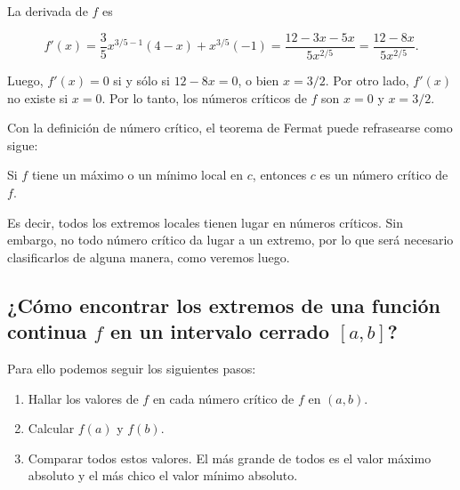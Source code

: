 \documentclass[
  letterpaper,
]{book}
\providecommand{\tightlist}{%
  \setlength{\itemsep}{0pt}\setlength{\parskip}{0pt}}
\theoremstyle{plain}
\theoremstyle{remark}
\begin{document}
\begin{tcolorbox}[enhanced jigsaw, opacityback=0, left=2mm, opacitybacktitle=0.6, toprule=.15mm, bottomrule=.15mm, colbacktitle=quarto-callout-tip-color!10!white, titlerule=0mm, bottomtitle=1mm, title=\textcolor{quarto-callout-tip-color}{\faLightbulb}\hspace{0.5em}{Solución}, toptitle=1mm, colframe=quarto-callout-tip-color-frame, colback=white, breakable, rightrule=.15mm, arc=.35mm, leftrule=.75mm, coltitle=black]

La derivada de \(f\) es

\[
f'(x)=\frac{3}{5}x^{3/5-1}(4-x)+x^{3/5}(-1)=\frac{12-3x-5x}{5x^{2/5}}=\frac{12-8x}{5x^{2/5}}.
\]

Luego, \(f'(x)=0\) si y sólo si \(12-8x=0\), o bien \(x=3/2\). Por otro
lado, \(f'(x)\) no existe si \(x=0\). Por lo tanto, los números críticos
de \(f\) son \(x=0\) y \(x=3/2\).

\end{tcolorbox}

Con la definición de número crítico, el teorema de Fermat puede
refrasearse como sigue:

Si \(f\) tiene un máximo o un mínimo local en \(c\), entonces \(c\) es
un número crítico de \(f\).

Es decir, todos los extremos locales tienen lugar en números críticos.
Sin embargo, no todo número crítico da lugar a un extremo, por lo que
será necesario clasificarlos de alguna manera, como veremos luego.

\subsection{\texorpdfstring{¿Cómo encontrar los extremos de una función
continua \(f\) en un intervalo cerrado
\([a,b]\)?}{¿Cómo encontrar los extremos de una función continua f en un intervalo cerrado {[}a,b{]}?}}\label{cuxf3mo-encontrar-los-extremos-de-una-funciuxf3n-continua-f-en-un-intervalo-cerrado-ab}

Para ello podemos seguir los siguientes pasos:

\begin{enumerate}
\def\labelenumi{\arabic{enumi}.}
\tightlist
\item
  Hallar los valores de \(f\) en cada número crítico de \(f\) en
  \((a,b)\).
\item
  Calcular \(f(a)\) y \(f(b)\).
\item
  Comparar todos estos valores. El más grande de todos es el valor
  máximo absoluto y el más chico el valor mínimo absoluto.
\end{enumerate}
\end{document}

